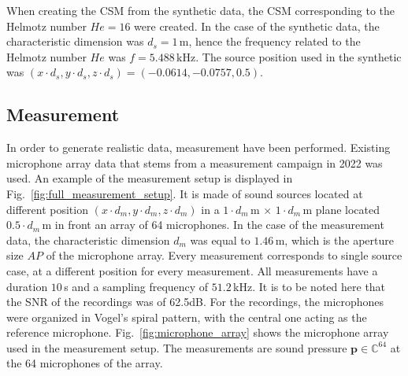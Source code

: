 \documentclass[11pt,a4paper,twoside]{report}
\begin{document}
When creating the CSM from the synthetic data, the CSM corresponding to the Helmotz number $He = 16$ were created. In the case of the synthetic data, the characteristic dimension was $d_s = 1\,$m, hence the frequency related to the Helmotz number $He$ was $f = 5.488\, \mathrm{kHz}$. The source position used in the synthetic was $(x \cdot d_s,y \cdot d_s, z \cdot d_s) = (-0.0614,-0.0757, 0.5)$.

\subsection{Measurement}

In order to generate realistic data, measurement have been performed. Existing microphone array data that stems from a measurement campaign in 2022 was used. An example of the measurement setup is displayed in Fig.~\ref{fig:full_measurement_setup}. It is made of sound sources located at different position $(x \cdot d_m,y \cdot d_m, z \cdot d_m)$ in a $1 \cdot d_m\,$m $\times$ $1 \cdot d_m\,$m plane located $0.5 \cdot d_m\,$m in front an array of 64 microphones. In the case of the measurement data, the characteristic dimension $d_m$ was equal to $1.46\,$m, which is the aperture size $AP$ of the microphone array. Every measurement corresponds to single source case, at a different position for every measurement. All measurements have a duration $10\,$s and a sampling frequency of $51.2\,$kHz. It is to be noted here that the SNR of the recordings was of 62.5dB. For the recordings, the microphones were organized in Vogel's spiral pattern, with the central one acting as the reference microphone. Fig.~\ref{fig:microphone_array} shows the microphone array used in the measurement setup. The measurements are sound pressure $\mathbf{p} \in \mathbb{C}^{64}$ at the 64 microphones of the array.
\end{document}
